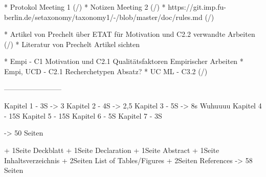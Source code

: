 * Protokol Meeting 1 (/)
* Notizen Meeting 2 (/)
* https://git.imp.fu-berlin.de/setaxonomy/taxonomy1/-/blob/master/doc/rules.md (/)

* Artikel von Prechelt über ETAT für Motivation und C2.2 verwandte Arbeiten (/)
* Literatur von Prechelt Artikel sichten 

* Empi - C1 Motivation und C2.1 Qualitätsfaktoren Empirischer Arbeiten
* Empi, UCD - C2.1 Recherchetypen Absatz?
* UC ML - C3.2 (/)



------------------------

Kapitel 1 - 3S -> 3
Kapitel 2 - 4S -> 2,5
Kapitel 3 - 5S -> 8s Wuhuuuu
Kapitel 4 - 15S
Kapitel 5 - 15S
Kapitel 6 - 5S
Kapitel 7 - 3S

-> 50 Seiten

+ 1Seite Deckblatt
+ 1Seite Declaration
+ 1Seite Abstract
+ 1Seite Inhaltsverzeichnis
+ 2Seiten List of Tables/Figures
+ 2Seiten References
 -> 58 Seiten
